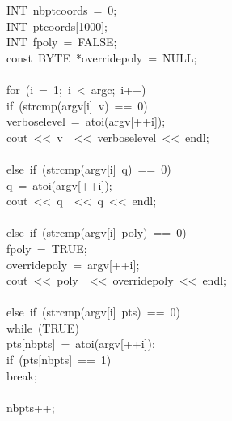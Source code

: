 \begin{tabbing}
\>INT\ nbptcoords\ =\ 0;\\[0pt]
\>INT\ ptcoords[1000];\\[0pt]
\>INT\ fpoly\ =\ FALSE;\\[0pt]
\>const\ BYTE\ *overridepoly\ =\ NULL;\\[0pt]
\>\\[0pt]
\>for\ (i\ =\ 1;\ i\ <\ argc;\ i++)\ \\[0pt]
\>\>if\ (strcmp(argv[i]\ v)\ ==\ 0)\ \\[0pt]
\>\>\>verboselevel\ =\ atoi(argv[++i]);\\[0pt]
\>\>\>cout\ <<\ v\ \ <<\ verboselevel\ <<\ endl;\\[0pt]
\>\>\>\\[0pt]
\>\>else\ if\ (strcmp(argv[i]\ q)\ ==\ 0)\ \\[0pt]
\>\>\>q\ =\ atoi(argv[++i]);\\[0pt]
\>\>\>cout\ <<\ q\ \ <<\ q\ <<\ endl;\\[0pt]
\>\>\>\\[0pt]
\>\>else\ if\ (strcmp(argv[i]\ poly)\ ==\ 0)\ \\[0pt]
\>\>\>fpoly\ =\ TRUE;\\[0pt]
\>\>\>overridepoly\ =\ argv[++i];\\[0pt]
\>\>\>cout\ <<\ poly\ \ <<\ overridepoly\ <<\ endl;\\[0pt]
\>\>\>\\[0pt]
\>\>else\ if\ (strcmp(argv[i]\ pts)\ ==\ 0)\ \\[0pt]
\>\>\>while\ (TRUE)\ \\[0pt]
\>\>\>\>pts[nbpts]\ =\ atoi(argv[++i]);\\[0pt]
\>\>\>\>if\ (pts[nbpts]\ ==\ 1)\ \\[0pt]
\>\>\>\>\>break;\\[0pt]
\>\>\>\>\>\\[0pt]
\>\>\>\>nbpts++;\\[0pt]
\>\>\>\>\\[0pt]

\end{tabbing}
